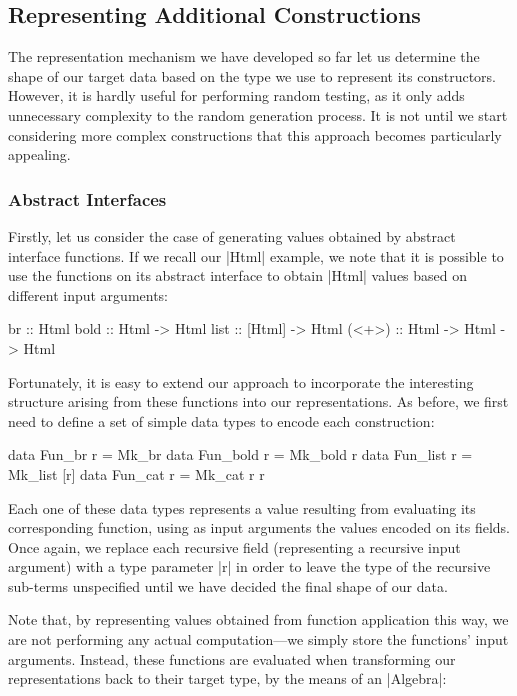 %
\subsection{Representing Additional Constructions}

The representation mechanism we have developed so far let us determine the shape
of our target data based on the type we use to represent its constructors.
%
However, it is hardly useful for performing random testing, as it only adds
unnecessary complexity to the random generation process.
%
It is not until we start considering more complex constructions that this
approach becomes particularly appealing.

%
%
\subsubsection{Abstract Interfaces}

Firstly, let us consider the case of generating values obtained by abstract
interface functions.
%
If we recall our |Html| example, we note that it is possible to use the
functions on its abstract interface to obtain |Html| values based on different
input arguments:

\begin{code}
br     ::                      Html
bold   ::  Html    ->          Html
list   ::  [Html]  ->          Html
(<+>)  ::  Html    -> Html ->  Html
\end{code}
%
Fortunately, it is easy to extend our approach to incorporate the interesting
structure arising from these functions into our representations.
%
As before, we first need to define a set of simple data types to encode each
construction:

\begin{code}
data Fun_br     r = Mk_br
data Fun_bold   r = Mk_bold r
data Fun_list   r = Mk_list [r]
data Fun_cat    r = Mk_cat  r r
\end{code}
%
Each one of these data types represents a value resulting from evaluating its
corresponding function, using as input arguments the values encoded on its
fields.
%
Once again, we replace each recursive field (representing a recursive input
argument) with a type parameter |r| in order to leave the type of the recursive
sub-terms unspecified until we have decided the final shape of our data.


Note that, by representing values obtained from function application this way,
we are not performing any actual computation---we simply store the functions'
input arguments.
%
Instead, these functions are evaluated when transforming our representations
back to their target type, by the means of an |Algebra|:

